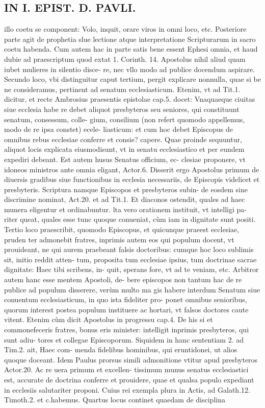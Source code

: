 \documentclass{article}
\begin{document}
\begin{pages}
\section*{IN I. EPIST. D. PAVLI. }
\marginpar{[ p.2 ]}\pstart illo coetu se component: Volo, inquit, orare viros in omni loco, etc. Posteriore parte agit de prophetia slue lectione atque  interpretatione Scripturarum in sacro coetu habenda.  \pend\pstart Cum autem hac in parte satis bene essent Ephesi omnia, et haud dubie ad praescriptum quod extat 1. Corinth. 14. Apostolus nihil aliud quam iubet mulieres in silentio disce- re, nec vllo modo ad publice docendum aspirare.  \pend\pstart Secundo loco, vbi distinguitur caput tertium, pergit explicare nonnulla, quae si be ne consideramus, pertinent ad senatum ecclesiasticum. Etenim, vt ad Tit.1. dicitur, et recte Ambrosius praesentis epistolae cap.5. docet: Vnaquaeque  ciuitas siue ecclesia habe re debet aliquot presbyteros seu seniores, qui constituunt senatum, consessum, colle- gium, consilium (non refert quomodo appellemus, modo de re ipsa constet) ecele- liasticum: et cum hoc debet Episcopus de omnibus rebus ecclesiae conferre et consie? capere. Quae proinde sequuntur, aliquot locis explicata eiusmodisunt, vt in senatu ecclesiastico et per eundem expediri debeant. Est autem husus Senatus officium, ec- clesiae proponere, vt idoneos ministros ante omnia eligant, Actor.6. Disserit ergo Apostolus primum de diuersis gradibus siue functionibus in ecclesia necessariis, de Episcopis videlicet et presbyteris. Scriptura namque  Episcopos et presbyteros subin- de eosdem sine discrimine nominat, Act.20. et ad Tit.1. Et diaconos ostendit, quales ad haec munera eligentur et ordinabuntur. lta vero orationem instituit, vt intelligi pa- riter queat, quales esse tunc quoque  conueniat, cùm iam in dignitate sunt positi.  \pend\pstart Tertio loco praescribit, quomodo Episcopus, et quicunque  praeest ecclesiae, pruden ter admonebit fratres, inprimis autem eos qui populum docent, vt prouideant, ne qui aurem praebeant falsis doctoribus: cumque  hoc loco sublimis sit, initio reddit atten- tum, proposita tum ecclesiae ipsius, tum doctrinae sacrae dignitate: Haec tibi scribens, in- quit, sperans fore, vt ad te veniam, etc. Arbitror autem hanc esse mentem Apostoli, de- bere episcopos non tantum hac de re publice ad populum disserere, verùm multo ma gis habere interdum Senatum siue conuentum ecclesiasticum, in quo ista fideliter pro- ponet omnibus senioribus, quorum interest postea populum instituere ac hortari, vt   falsos doctores caute vitent. Etenim cùm dicit Apostolus in progressu cap.4. De his si   et commonefeceris fratres, bonus eris minister: intelligit inprimis presbyteros, qui sunt adiu-   tores et collegae Episcoporum. Siquidem in hanc sententiam 2. ad Tim.2. ait, Haec com- menda fidelibus hominibus, qui eruntidonei, ut alios quoque doceant. Idem Paulus prorsus simili admonitione vtitur apud presbyteros Actor.20. Ac re uera primum et excellen- tissimum munus senatus ecclesiastici est, accurate de doctrina conferre et prouidere, quae et qualsa populo expediant in ecclesiis salutariter proponi. Cuius rei exempla plura in Actis, ad Galath.12. Timoth.2. et c.habemus.  \pend\pstart Quartus locus continet quaedam de disciplina 
\end{pages}
\end{document}

